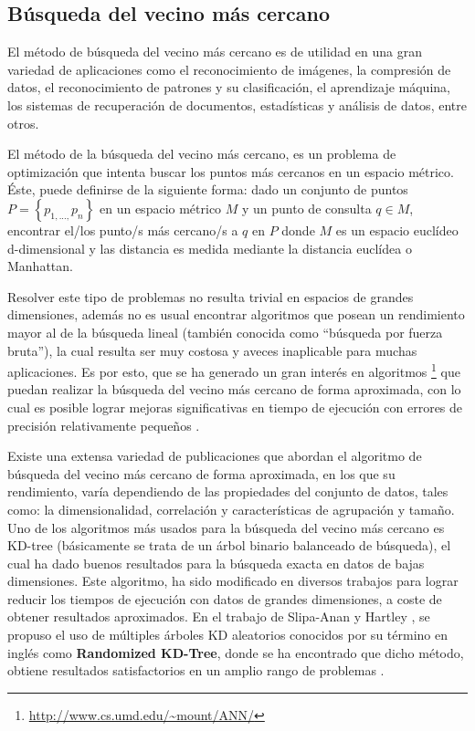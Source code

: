 \documentclass[a4paper,11pt,spanish]{article}
\begin{document}
\subsection{Búsqueda del vecino más cercano}
El m\'etodo de búsqueda del vecino más cercano es de utilidad en una gran variedad de aplicaciones como el reconocimiento de imágenes, la compresión de datos, el reconocimiento de patrones y su clasificación, el aprendizaje máquina, los sistemas de recuperación de documentos, estadísticas y análisis de datos, entre otros. 

El método de la búsqueda del vecino más cercano, es un problema de optimización que intenta buscar los puntos más cercanos en un espacio métrico. Éste, puede definirse de la siguiente forma: dado un conjunto de puntos $P=\left\{ p_{1,...,}p_{n}\right\}$ en un espacio métrico $M$ y un punto de consulta $q \in M$, encontrar el/los punto/s más cercano/s a $q$ en $P$ donde $M$ es un espacio euclídeo d-dimensional y las distancia es medida mediante la distancia euclídea o Manhattan. 

Resolver este tipo de problemas no resulta trivial en espacios de grandes dimensiones, además no es usual encontrar algoritmos que posean un rendimiento mayor al de la búsqueda lineal (también conocida como ``búsqueda por fuerza bruta''), la cual resulta ser muy costosa y aveces inaplicable para muchas aplicaciones. Es por esto, que se ha generado un gran interés en algoritmos \footnote{\url{http://www.cs.umd.edu/~mount/ANN/}} que puedan realizar la búsqueda del vecino más cercano de forma aproximada, con lo cual es posible lograr mejoras significativas en tiempo de ejecución con errores de precisión relativamente pequeños \cite{Beis:1997:SIU:794189.794431} .

Existe una extensa variedad de publicaciones \cite{Muja09fastapproximate, AryaEtAl98, Beis:1997:SIU:794189.794431, conf/nips/LiuMGY04} que abordan el algoritmo de búsqueda del vecino más cercano de forma aproximada, en los que su rendimiento, varía dependiendo de las propiedades del conjunto de datos, tales como: la dimensionalidad, correlación y características de agrupación y tamaño. 
Uno de los algoritmos más usados para la búsqueda del vecino más cercano es KD-tree \cite{Beis:1997:SIU:794189.794431, friedman-an-algorithm-toms-77} (básicamente se trata de un árbol binario balanceado de búsqueda), el cual ha dado buenos resultados para la búsqueda exacta en datos de bajas dimensiones. Este algoritmo, ha sido modificado en diversos trabajos \cite{bb23918, AryaEtAl98, Beis:1997:SIU:794189.794431, VLDB95574, Fukunaga75, bb78856, bb79759, conf/nips/LiuMGY04, bb77826} para lograr reducir los tiempos de ejecución con datos de grandes dimensiones, a coste de obtener resultados aproximados. En el trabajo de Slipa-Anan y Hartley \cite{Silpa_KDTree, bb77826}, se propuso el uso de múltiples árboles KD aleatorios conocidos por su término en inglés como \textbf{Randomized KD-Tree}, donde se ha encontrado que dicho método, obtiene resultados satisfactorios en un amplio rango de problemas \cite{Muja09fastapproximate}.
\end{document}
